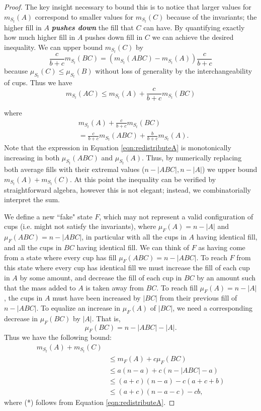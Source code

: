 \documentclass[twocolumn]{article}[10pt]
\newcommand{\defn}[1]{{\textit{\textbf{\boldmath #1}}}\xspace}
\begin{document}
\begin{proof}
The key insight necessary to bound this is to notice that larger values for
$m_{S_t}(A)$ correspond to smaller values for $m_{S_t}(C)$ because of the
invariants; the higher fill in $A$ \defn{pushes down} the fill that $C$ can
have. By quantifying exactly how much higher fill in $A$ pushes down fill in
$C$ we can achieve the desired inequality.
We can upper bound $m_{S_t}(C)$ by 
$$\frac{c}{b+c}m_{S_t}(BC) = (m_{S_t}(ABC) - m_{S_t}(A))\frac{c}{b+c}$$ because
$\mu_{S_t}(C) \le \mu_{S_t}(B)$ without loss of generality by the
interchangeability of cups.
Thus we have 
\begin{equation}
  \label{eqn:BCdiscounted}
m_{S_t}(AC) \le m_{S_t}(A) + \frac{c}{b+c}m_{S_t}(BC)
\end{equation}
{\color{red}
where 
\begin{equation}
  \label{eqn:redistributeA}
\begin{split}
  &m_{S_t}(A) + \frac{c}{b+c}m_{S_t}(BC) \\
  &= \frac{c}{b+c}m_{S_t}(ABC) + \frac{b}{b+c}m_{S_t}(A).
\end{split}
\end{equation}
Note that the expression in Equation \ref{eqn:redistributeA} is monotonically
increasing in both $\mu_{S_t}(ABC)$ and $\mu_{S_t}(A)$. 
Thus, by numerically replacing both average fills with
their extremal values ($n-|ABC|, n-|A|$) we upper bound $m_{S_t}(A) + m_{S_t}(C)$.
At this point the inequality can be verified by straightforward algebra,
however this is not elegant; instead, we combinatorially interpret the sum.

We define a new ``fake" state $F$, which may not represent
a valid configuration of cups (i.e. might not satisfy the invariants), where
$\mu_F(A)=n-|A|$ and $\mu_F(ABC)=n-|ABC|$, in particular with all the cups in $A$
having identical fill, and all the cups in $BC$ having identical fill.
We can think of $F$ as having come from a state where every cup has fill
$\mu_F(ABC) = n-|ABC|$. To reach $F$ from this state where every cup has
identical fill we must increase the fill of each cup in $A$ by some amount, and
decrease the fill of each cup in $BC$ by an amount such that the mass added to
$A$ is taken away from $BC$. To reach fill $\mu_F(A) = n-|A|$, the cups in $A$
must have been increased by $|BC|$ from their previous fill of $n-|ABC|$.
To equalize an increase in $\mu_{F}(A)$ of $|BC|$, we need a corresponding
decrease in $\mu_{F}(BC)$ by $|A|$.
That is, $$\mu_{F}(BC) = n-|ABC|-|A|.$$
Thus we have the following bound:
\begin{align*}
  m_{S_t}(A) + m_{S_t}(C)& \\
&\le m_{F}(A) + c\mu_{F}(BC) \tag{*}\\
&\le a(n-a) + c(n-|ABC|-a) \\
&\le (a+c)(n-a) - c(a+c+b) \\
&\le (a+c)(n-a-c) - cb,
\end{align*}
where (*) follows from Equation \ref{eqn:redistributeA}.
}


\end{proof}
\end{document}
